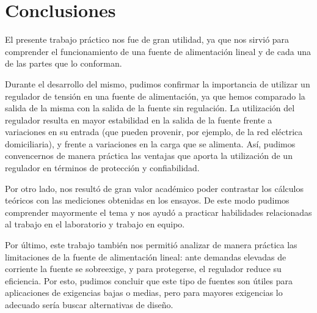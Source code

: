 \documentclass[chaptersright]{informeutn}
\begin{document}
  \chapter{Conclusiones}
    El presente trabajo práctico nos fue de gran utilidad, ya que nos sirvió para comprender el funcionamiento de una
    fuente de alimentación lineal y de cada una de las partes que lo conforman.

    Durante el desarrollo del mismo, pudimos confirmar la importancia de utilizar un regulador de tensión en una
    fuente de alimentación, ya que hemos comparado la salida de la misma con la salida de la fuente sin regulación. La
    utilización del regulador resulta en mayor estabilidad en la salida de la fuente frente a variaciones en su entrada
    (que pueden provenir, por ejemplo, de la red eléctrica domiciliaria), y frente a variaciones en la carga que se
    alimenta. Así, pudimos convencernos de manera práctica las ventajas que aporta la utilización de un regulador en
    términos de protección y confiabilidad.

    Por otro lado, nos resultó de gran valor académico poder contrastar los cálculos teóricos con las mediciones
    obtenidas en los ensayos. De este modo pudimos comprender mayormente el tema y nos ayudó a practicar habilidades
    relacionadas al trabajo en el laboratorio y trabajo en equipo.

    Por último, este trabajo también nos permitió analizar de manera práctica las limitaciones de la fuente de
    alimentación lineal: ante demandas elevadas de corriente la fuente se sobreexige, y para protegerse, el regulador
    reduce su eficiencia. Por esto, pudimos concluir que este tipo de fuentes son útiles para aplicaciones de
    exigencias bajas o medias, pero para mayores exigencias lo adecuado sería buscar alternativas de diseño.
\end{document}
